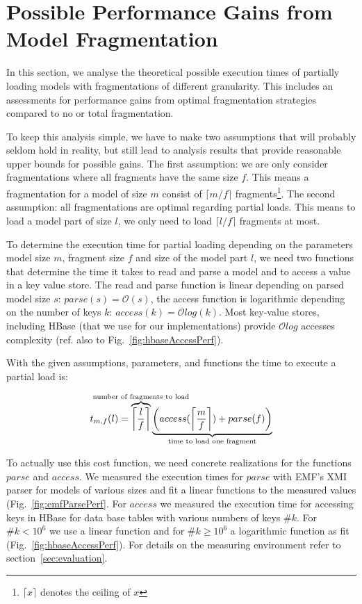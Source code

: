 \section{Possible Performance Gains from Model Fragmentation}
\label{sec:gains}

In this section, we analyse the theoretical possible execution times of partially loading models with fragmentations of different granularity. This includes an assessments for performance gains from optimal fragmentation strategies compared to no or total fragmentation.

To keep this analysis simple, we have to make two assumptions that will probably seldom hold in reality, but still lead to analysis results that provide reasonable upper bounds for possible gains.
The first assumption: we are only consider fragmentations where all fragments have the same size $f$. 
This means a fragmentation for a model of size $m$ consist of $\lceil m/f \rceil$ fragments\footnote{$\lceil x\rceil$ denotes the ceiling of $x$}. 
The second assumption: all fragmentations are optimal regarding partial loads. This means to load a model part of size $l$, we only need to load $\lceil l/f\rceil$ fragments at most.

To determine the execution time for partial loading depending on the parameters model size $m$, fragment size $f$ and size of the model part $l$, we need two functions that determine the time it takes to read and parse a model and to access a value in a key value store. The read and parse function is linear depending on parsed model size $s$: $parse(s)=\mathcal{O}\left(s\right)$, the access function is logarithmic depending on the number of keys $k$: $access(k)=\mathcal{O}log(k)$. Most key-value stores, including HBase (that we use for our implementations) provide $\mathcal{O}log$ accesses complexity (ref. also to Fig.~\ref{fig:hbaseAccessPerf}).

With the given assumptions, parameters, and functions the time to execute a partial load is:

$$t_{m,f}(l)=\overbrace{\left\lceil\frac{l}{f}\right\rceil}^{\mathclap{\text{number of fragments to load}}}\underbrace{\left(access(\left\lceil\frac{m}{f}\right\rceil) + parse(f)\right)}_{\mathclap{\text{time to load one fragment}}}$$

To actually use this cost function, we need concrete realizations for the functions $parse$ and $access$. We measured the execution times for $parse$ with EMF's XMI parser for models of various sizes and fit a linear functions to the measured values (Fig.~\ref{fig:emfParsePerf}. For $access$ we measured the execution time for accessing keys in HBase for data base tables with various numbers of keys $\#k$. For $\#k<10^6$ we use a linear function and for $\#k\ge 10^6$ a logarithmic function as fit (Fig.~\ref{fig:hbaseAccessPerf}). For details on the measuring environment refer to section~\ref{sec:evaluation}.

